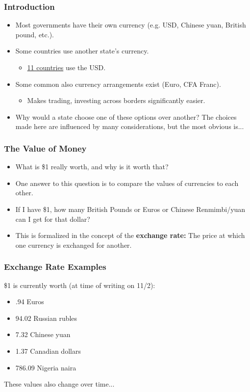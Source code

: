 \documentclass[handout]{beamer}
\begin{document}
\begin{frame} 
	\frametitle{\LARGE{Introduction}}
	\begin{itemize}
		\item Most governments have their own currency (e.g. USD, Chinese yuan, British pound, etc.). \pause
		\item Some countries use another state's currency. \pause
		\begin{itemize}
			\item \href{https://www.investopedia.com/articles/forex/040915/countries-use-us-dollar.asp}{11 countries} use the USD. \pause 
		\end{itemize}
		\item Some common also currency arrangements exist (Euro, CFA Franc).  \pause
		\begin{itemize}
			\item Makes trading, investing across borders significantly easier. \pause 
		\end{itemize}	
		\item Why would a state choose one of these options over another? The choices made here are influenced by many considerations, but the most obvious is...
	\end{itemize}
\end{frame}


\begin{frame} 
	\frametitle{\LARGE{The Value of Money}}
	\begin{itemize}
		\item What is \$1 really worth, and why is it worth that? \pause
		\item One answer to this question is to compare the values of currencies to each other. \pause
		\item If I have \$1, how many British Pounds or Euros or Chinese Renmimbi/yuan can I get for that dollar? \pause
		\item This is formalized in the concept of the \textbf{exchange rate:} The price at which one currency is exchanged for another. 	
	\end{itemize}
\end{frame}

\begin{frame} 
	\frametitle{\LARGE{Exchange Rate Examples}}
\$1 is currently worth (at time of writing on 11/2):
	\begin{itemize}
		\item .94 Euros \pause
		\item 94.02 Russian rubles \pause
		\item 7.32 Chinese yuan \pause
		\item 1.37 Canadian dollars \pause
		\item 786.09 Nigeria naira \pause
	\end{itemize}
These values also change over time...
\end{frame}
\end{document}
